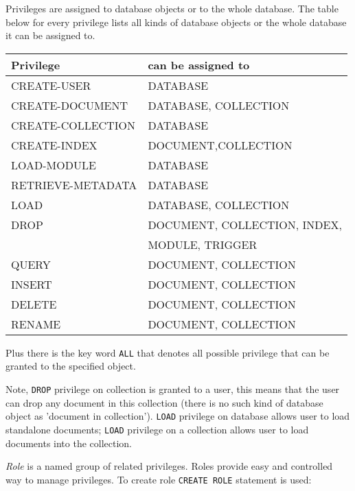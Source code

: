 \documentclass[a4paper,12pt]{article}
\begin{document}
Privileges are assigned to database objects or to the whole database. The table below for every privilege lists all kinds of database objects or the whole database it can be assigned to.

\begin{tabular}{|l|l|}
\hline
\hline
Privilege            & can be assigned to             \\
\hline
\hline
CREATE-USER          & DATABASE                       \\
\hline
CREATE-DOCUMENT      & DATABASE, COLLECTION           \\
\hline
CREATE-COLLECTION    & DATABASE                       \\
\hline
CREATE-INDEX         & DOCUMENT,COLLECTION            \\
\hline
LOAD-MODULE          & DATABASE                       \\
\hline
RETRIEVE-METADATA    & DATABASE                       \\
\hline
LOAD                 & DATABASE, COLLECTION           \\
\hline
DROP                 & DOCUMENT, COLLECTION, INDEX, \\
                     & MODULE, TRIGGER    \\
\hline
QUERY                & DOCUMENT, COLLECTION           \\
\hline
INSERT               & DOCUMENT, COLLECTION           \\
\hline
DELETE               & DOCUMENT, COLLECTION           \\
\hline
RENAME               & DOCUMENT, COLLECTION           \\
\hline
\end{tabular}

Plus there is the key word \verb!ALL! that denotes all possible privilege that can be granted to the specified object.

Note, \verb!DROP! privilege on collection is granted to a user, this means that the user can drop any document in this collection (there is no such kind of database object as 'document in collection'). \verb!LOAD! privilege on database allows user to load standalone documents; \verb!LOAD! privilege on a collection allows user to load documents into the collection.

\emph{Role} is a named group of related privileges. Roles provide easy and controlled way to manage privileges. To create role \verb!CREATE ROLE! statement is used:
\end{document}
